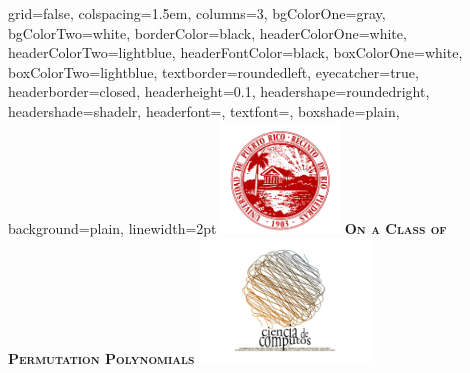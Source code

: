\documentclass[landscape,final,paperwidth=48in,paperheight=38in]{baposter}
\begin{document}
\begin{poster}%
  {
  grid=false,
  colspacing=1.5em,
  columns=3,
  bgColorOne=gray,
  bgColorTwo=white,
  borderColor=black,
  headerColorOne=white,
  headerColorTwo=lightblue,
  headerFontColor=black,
  boxColorOne=white,
  boxColorTwo=lightblue,
  textborder=roundedleft,
  eyecatcher=true,
  headerborder=closed,
  headerheight=0.1\textheight,
  headershape=roundedright,
  headershade=shadelr,
  headerfont=\Large\textsc, %
  textfont=\large{\setlength{\parindent}{1.5em}},
  boxshade=plain,
  background=plain,
  linewidth=2pt
  }
  {\includegraphics[height=8em,keepaspectratio=true]{images/logo_uprrp}} 
  {\bf\textsc{On a Class of Permutation Polynomials}\vspace{0.1em}}
  {}
  {%
    \includegraphics[height=9em,keepaspectratio=true]{images/logo_ccom}
  }

    \newcommand{\colouredcircle}{%
      \tikz{\useasboundingbox (-0.2em,-0.32em) rectangle(0.2em,0.32em); \draw[draw=black,fill=lightblue,line width=0.03em] (0,0) circle(0.18em);}}


\end{poster}
\end{document}
